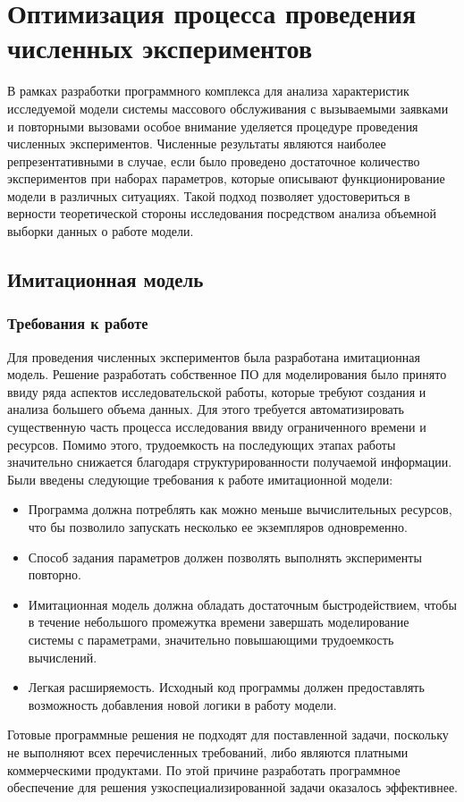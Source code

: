\section{Оптимизация процесса проведения численных экспериментов}
В рамках разработки программного комплекса для анализа характеристик исследуемой модели системы массового обслуживания с вызываемыми заявками и повторными вызовами особое внимание уделяется процедуре проведения численных экспериментов. Численные результаты являются наиболее репрезентативными в случае, если было проведено достаточное количество экспериментов при наборах параметров, которые описывают функционирование модели в различных ситуациях. Такой подход позволяет удостовериться в верности теоретической стороны исследования посредством анализа объемной выборки данных о работе модели.

\subsection{Имитационная модель}
\subsubsection{Требования к работе}
Для проведения численных экспериментов была разработана имитационная модель. Решение разработать собственное ПО для моделирования было принято ввиду ряда аспектов исследовательской работы, которые требуют создания и анализа большего объема данных. Для этого требуется автоматизировать существенную часть процесса исследования ввиду ограниченного времени и ресурсов. Помимо этого, трудоемкость на последующих этапах работы значительно снижается благодаря структурированности получаемой информации.
Были введены следующие требования к работе имитационной модели:
\begin{itemize}
	\item Программа должна потреблять как можно меньше вычислительных ресурсов, что бы позволило запускать несколько ее экземпляров одновременно.
	\item Способ задания параметров должен позволять выполнять эксперименты повторно.
	\item Имитационная модель должна обладать достаточным быстродействием, чтобы в течение небольшого промежутка времени завершать моделирование системы с параметрами, значительно повышающими трудоемкость вычислений.
	\item Легкая расширяемость. Исходный код программы должен предоставлять возможность добавления новой логики в работу модели.
\end{itemize}
Готовые программные решения не подходят для поставленной задачи, поскольку не выполняют всех перечисленных требований, либо являются платными коммерческими продуктами. По этой причине разработать программное обеспечение для решения узкоспециализированной задачи оказалось эффективнее.


